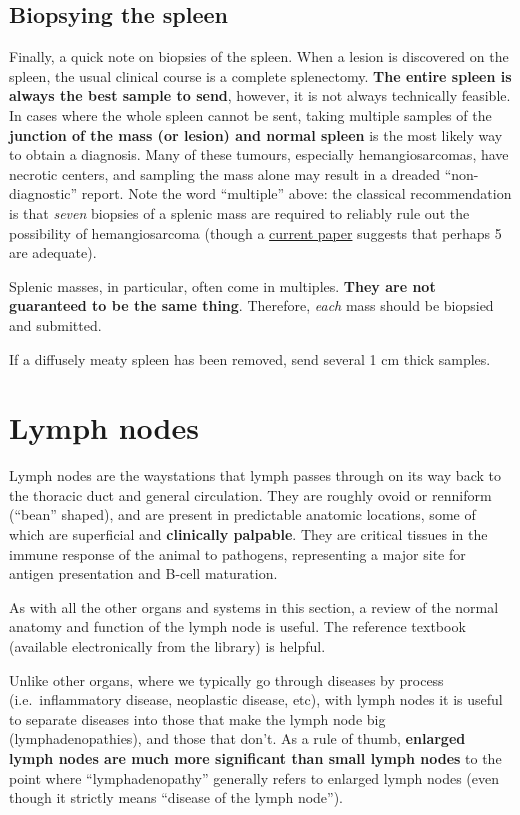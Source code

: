 \documentclass[openany]{article}
\begin{document}
\hypertarget{biopsying-the-spleen}{\subsection{Biopsying the
spleen}\label{biopsying-the-spleen}}

Finally, a quick note on biopsies of the spleen. When a lesion is
discovered on the spleen, the usual clinical course is a complete
splenectomy. \textbf{The entire spleen is always the best sample to
send}, however, it is not always technically feasible. In cases where
the whole spleen cannot be sent, taking multiple samples of the
\textbf{junction of the mass (or lesion) and normal spleen} is the most
likely way to obtain a diagnosis. Many of these tumours, especially
hemangiosarcomas, have necrotic centers, and sampling the mass alone may
result in a dreaded ``non-diagnostic'' report. Note the word
``multiple'' above: the classical recommendation is that \emph{seven}
biopsies of a splenic mass are required to reliably rule out the
possibility of hemangiosarcoma (though a
\href{https://journals.sagepub.com/doi/full/10.1177/0300985819868732}{current
paper} suggests that perhaps 5 are adequate).

Splenic masses, in particular, often come in multiples. \textbf{They are
not guaranteed to be the same thing}. Therefore, \emph{each} mass should
be biopsied and submitted.

If a diffusely meaty spleen has been removed, send several 1 cm thick
samples.

\section{Lymph nodes}\label{lymph-nodes}

Lymph nodes are the waystations that lymph passes through on its way
back to the thoracic duct and general circulation. They are roughly
ovoid or renniform (``bean'' shaped), and are present in predictable
anatomic locations, some of which are superficial and \textbf{clinically
palpable}. They are critical tissues in the immune response of the
animal to pathogens, representing a major site for antigen presentation
and B-cell maturation.

As with all the other organs and systems in this section, a review of
the normal anatomy and function of the lymph node is useful. The
reference textbook (available electronically from the library) is
helpful.

Unlike other organs, where we typically go through diseases by process
(i.e.~inflammatory disease, neoplastic disease, etc), with lymph nodes
it is useful to separate diseases into those that make the lymph node
big (lymphadenopathies), and those that don't. As a rule of thumb,
\textbf{enlarged lymph nodes are much more significant than small lymph
nodes} to the point where ``lymphadenopathy'' generally refers to
enlarged lymph nodes (even though it strictly means ``disease of the
lymph node'').
\end{document}
